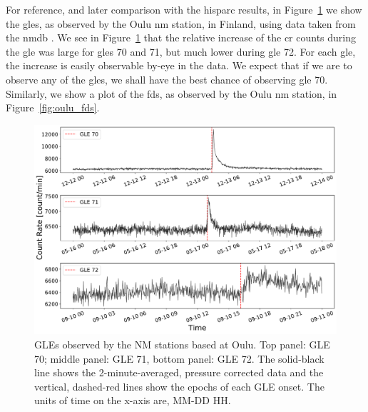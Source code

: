 For reference, and later comparison with the \gls{hisparc} results, in Figure~\ref{fig:oulu_gles} we show the \glspl{gle}, as observed by the Oulu \gls{nm} station, in Finland, using data taken from the \gls{nmdb} \citep{nmdb_nmdb_nodate}. We see in Figure~\ref{fig:oulu_gles} that the relative increase of the \gls{cr} counts during the \gls{gle} was large for \glspl{gle} 70 and 71, but much lower during \gls{gle} 72. For each \gls{gle}, the increase is easily observable by-eye in the data. We expect that if we are to observe any of the \glspl{gle}, we shall have the best chance of observing \gls{gle} 70. Similarly, we show a plot of the \glspl{fd}, as observed by the Oulu \gls{nm} station, in Figure~\ref{fig:oulu_fds}. 

\begin{figure}[ht!]
	\centering
	\includegraphics[width=0.75\columnwidth]{GLEs_OULU.pdf}
	\caption{GLEs observed by the NM stations based at Oulu. Top panel: GLE 70; middle panel: GLE 71, bottom panel: GLE 72. The solid-black line shows the 2-minute-averaged, pressure corrected data and the vertical, dashed-red lines show the epochs of each GLE onset. The units of time on the x-axis are, MM-DD HH.}
	\label{fig:oulu_gles}
\end{figure}

\vspace{2em}

